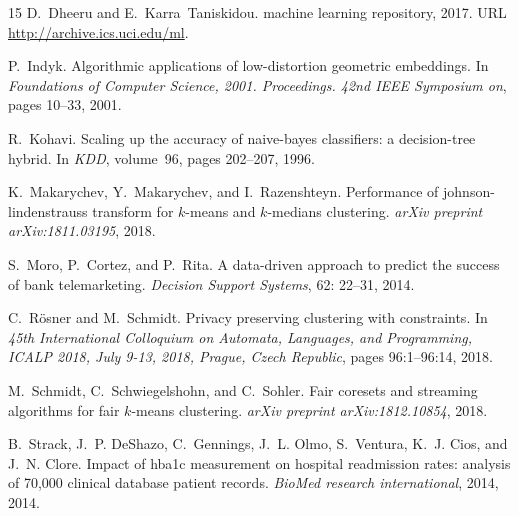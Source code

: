 \documentclass[11pt]{article}
\begin{document}
\begin{thebibliography}{15}
D.~Dheeru and E.~Karra~Taniskidou.
 machine learning repository, 2017.
\newblock URL \url{http://archive.ics.uci.edu/ml}.

P.~Indyk.
\newblock Algorithmic applications of low-distortion geometric embeddings.
\newblock In \emph{Foundations of Computer Science, 2001. Proceedings. 42nd
  IEEE Symposium on}, pages 10--33, 2001.

R.~Kohavi.
\newblock Scaling up the accuracy of naive-bayes classifiers: a decision-tree
  hybrid.
\newblock In \emph{KDD}, volume~96, pages 202--207, 1996.

K.~Makarychev, Y.~Makarychev, and I.~Razenshteyn.
\newblock Performance of johnson-lindenstrauss transform for {$k$}-means and
  {$k$}-medians clustering.
\newblock \emph{arXiv preprint arXiv:1811.03195}, 2018.

S.~Moro, P.~Cortez, and P.~Rita.
\newblock A data-driven approach to predict the success of bank telemarketing.
\newblock \emph{Decision Support Systems}, 62: 22--31, 2014.

C.~R{\"{o}}sner and M.~Schmidt.
\newblock Privacy preserving clustering with constraints.
\newblock In \emph{45th International Colloquium on Automata, Languages, and
  Programming, {ICALP} 2018, July 9-13, 2018, Prague, Czech Republic}, pages
  96:1--96:14, 2018.

M.~Schmidt, C.~Schwiegelshohn, and C.~Sohler.
\newblock Fair coresets and streaming algorithms for fair {$k$}-means
  clustering.
\newblock \emph{arXiv preprint arXiv:1812.10854}, 2018.

B.~Strack, J.~P. DeShazo, C.~Gennings, J.~L. Olmo, S.~Ventura, K.~J. Cios, and
  J.~N. Clore.
\newblock Impact of hba1c measurement on hospital readmission rates: analysis
  of 70,000 clinical database patient records.
\newblock \emph{BioMed research international}, 2014, 2014.

\end{thebibliography}
\appendix
%

\end{document}
